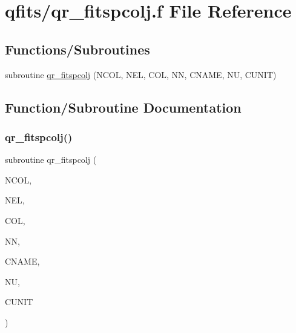\hypertarget{qr__fitspcolj_8f}{}\section{qfits/qr\+\_\+fitspcolj.f File Reference}
\label{qr__fitspcolj_8f}
\subsection*{Functions/\+Subroutines}
\begin{DoxyCompactItemize}
\item 
subroutine \hyperlink{qr__fitspcolj_8f_a381a7532e3ee9adc0142533bd3714e0d}{qr\+\_\+fitspcolj} (N\+C\+OL, N\+EL, C\+OL, NN, C\+N\+A\+ME, NU, C\+U\+N\+IT)
\end{DoxyCompactItemize}


\subsection{Function/\+Subroutine Documentation}
\mbox{\label{qr__fitspcolj_8f_a381a7532e3ee9adc0142533bd3714e0d}} 
\subsubsection{\texorpdfstring{qr\+\_\+fitspcolj()}{qr\_fitspcolj()}}
{\footnotesize\ttfamily subroutine qr\+\_\+fitspcolj (\begin{DoxyParamCaption}\item[{integer}]{N\+C\+OL,  }\item[{integer}]{N\+EL,  }\item[{integer, dimension(nel)}]{C\+OL,  }\item[{integer}]{NN,  }\item[{character$\ast$(nn)}]{C\+N\+A\+ME,  }\item[{integer}]{NU,  }\item[{character$\ast$(nu)}]{C\+U\+N\+IT }\end{DoxyParamCaption})}

